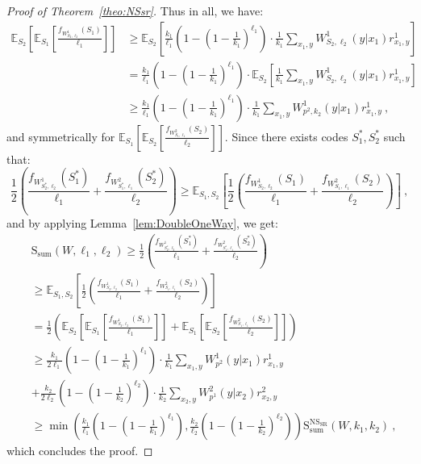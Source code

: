 \begin{proof}[Proof of Theorem~\ref{theo:NSsr}]
  Thus in all, we have:
  \begin{equation}
    \begin{aligned}
      \mathbb{E}_{S_2}\left[\mathbb{E}_{S_1}\left[ \frac{f_{W^1_{S_2,\ell_2}}(S_1)}{\ell_1}\right]\right] &\geq  \mathbb{E}_{S_2}\left[\frac{k_1}{\ell_1}\left(1-\left(1-\frac{1}{k_1}\right)^{\ell_1}\right) \cdot \frac{1}{k_1}\sum_{x_1,y} W^1_{S_2,\ell_2}(y|x_1)r^1_{x_1,y}\right]\\
      &=\frac{k_1}{\ell_1}\left(1-\left(1-\frac{1}{k_1}\right)^{\ell_1}\right) \cdot \mathbb{E}_{S_2}\left[\frac{1}{k_1}\sum_{x_1,y} W^1_{S_2,\ell_2}(y|x_1)r^1_{x_1,y}\right]\\
      &\geq \frac{k_1}{\ell_1}\left(1-\left(1-\frac{1}{k_1}\right)^{\ell_1}\right) \cdot \frac{1}{k_1}\sum_{x_1,y} W^1_{p^2,k_2}(y|x_1)r^1_{x_1,y} \ ,
    \end{aligned}
  \end{equation}
  and symmetrically for $\mathbb{E}_{S_1}\left[\mathbb{E}_{S_2}\left[ \frac{f_{W^2_{S_1,\ell_1}}(S_2)}{\ell_2}\right]\right]$. Since there exists codes $S_1^*,S_2^*$ such that:
  \[ \frac{1}{2}\left(\frac{f_{W^1_{S_2^*,\ell_2}}(S_1^*)}{\ell_1} + \frac{f_{W^2_{S_1^*,\ell_1}}(S_2^*)}{\ell_2}\right) \geq \mathbb{E}_{S_1,S_2}\left[\frac{1}{2}\left(\frac{f_{W^1_{S_2,\ell_2}}(S_1)}{\ell_1} + \frac{f_{W^2_{S_1,\ell_1}}(S_2)}{\ell_2}\right)\right]\ , \]  
  and by applying Lemma~\ref{lem:DoubleOneWay}, we get:  
  \begin{equation}
    \begin{aligned}
      &\mathrm{S}_{\text{sum}}(W,\ell_1,\ell_2) \geq \frac{1}{2}\left(\frac{f_{W^1_{S_2^*,\ell_2}}(S_1^*)}{\ell_1} + \frac{f_{W^2_{S_1^*,\ell_1}}(S_2^*)}{\ell_2}\right)\\
      &\geq  \mathbb{E}_{S_1,S_2}\left[\frac{1}{2}\left(\frac{f_{W^1_{S_2,\ell_2}}(S_1)}{\ell_1} + \frac{f_{W^2_{S_1,\ell_1}}(S_2)}{\ell_2}\right)\right]\\
      &= \frac{1}{2} \left(\mathbb{E}_{S_2}\left[\mathbb{E}_{S_1}\left[ \frac{f_{W^1_{S_2,\ell_2}}(S_1)}{\ell_1}\right]\right] + \mathbb{E}_{S_1}\left[\mathbb{E}_{S_2}\left[ \frac{f_{W^2_{S_1,\ell_1}}(S_2)}{\ell_2}\right]\right]\right)\\
      &\geq \frac{k_1}{2\ell_1}\left(1-\left(1-\frac{1}{k_1}\right)^{\ell_1}\right) \cdot \frac{1}{k_1}\sum_{x_1,y} W^1_{p^2}(y|x_1)r^1_{x_1,y}\\
      &+ \frac{k_2}{2\ell_2}\left(1-\left(1-\frac{1}{k_2}\right)^{\ell_2}\right) \cdot \frac{1}{k_2}\sum_{x_2,y}W^2_{p^1}(y|x_2)r^2_{x_2,y}\\
      &\geq  \min\left(\frac{k_1}{\ell_1}\left(1-\left(1-\frac{1}{k_1}\right)^{\ell_1}\right),\frac{k_2}{\ell_2}\left(1-\left(1-\frac{1}{k_2}\right)^{\ell_2}\right)\right)\mathrm{S}_{\text{sum}}^{\mathrm{NS}_{\mathrm{SR}}}(W,k_1,k_2) \ ,
    \end{aligned}
  \end{equation}
  which concludes the proof.
\end{proof}

